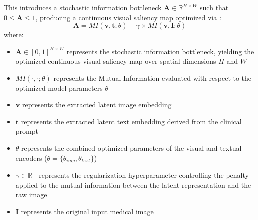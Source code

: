 This introduces a stochastic information bottleneck $\mathbf{A} \in \mathbb{R}^{H \times W}$ such that $0 \le \mathbf{A} \le 1$, producing a continuous visual saliency map optimized via \cite{medclipsam}:
\begin{equation}
\mathbf{A} = MI(\mathbf{v}, \mathbf{t}; \theta) - \gamma \times MI(\mathbf{v}, \mathbf{I}; \theta)
\end{equation}
where:
\begin{itemize}
\item $\mathbf{A} \in [0,1]^{H \times W}$ represents the stochastic information bottleneck, yielding the optimized continuous visual saliency map over spatial dimensions $H$ and $W$
\item $MI(\cdot, \cdot; \theta)$ represents the Mutual Information evaluated with respect to the optimized model parameters $\theta$
\item $\mathbf{v}$ represents the extracted latent image embedding
\item $\mathbf{t}$ represents the extracted latent text embedding derived from the clinical prompt
\item $\theta$ represents the combined optimized parameters of the visual and textual encoders ($\theta=\{\theta_{img},\theta_{text}\}$)
\item $\gamma \in \mathbb{R}^+$ represents the regularization hyperparameter controlling the penalty applied to the mutual information between the latent representation and the raw image
\item $\mathbf{I}$ represents the original input medical image
\end{itemize}

